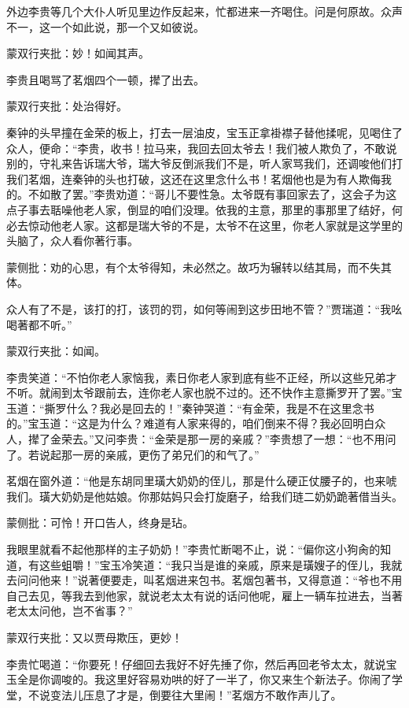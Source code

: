 \begin{parag}


    外边李贵等几个大仆人听见里边作反起来，忙都进来一齐喝住。问是何原故。众声不一，这一个如此说，那一个又如彼说。\begin{note}蒙双行夹批：妙！如闻其声。\end{note}李贵且喝骂了茗烟四个一顿，撵了出去。\begin{note}蒙双行夹批：处治得好。\end{note}秦钟的头早撞在金荣的板上，打去一层油皮，宝玉正拿褂襟子替他揉呢，见喝住了众人，便命：“李贵，收书！拉马来，我回去回太爷去！我们被人欺负了，不敢说别的，守礼来告诉瑞大爷，瑞大爷反倒派我们不是，听人家骂我们，还调唆他们打我们茗烟，连秦钟的头也打破，这还在这里念什么书！茗烟他也是为有人欺侮我的。不如散了罢。”李贵劝道：“哥儿不要性急。太爷既有事回家去了，这会子为这点子事去聒噪他老人家，倒显的咱们没理。依我的主意，那里的事那里了结好，何必去惊动他老人家。这都是瑞大爷的不是，太爷不在这里，你老人家就是这学里的头脑了，众人看你著行事。\begin{note}蒙侧批：劝的心思，有个太爷得知，未必然之。故巧为辗转以结其局，而不失其体。\end{note}众人有了不是，该打的打，该罚的罚，如何等闹到这步田地不管？”贾瑞道：“我吆喝著都不听。”\begin{note}蒙双行夹批：如闻。\end{note}李贵笑道：“不怕你老人家恼我，素日你老人家到底有些不正经，所以这些兄弟才不听。就闹到太爷跟前去，连你老人家也脱不过的。还不快作主意撕罗开了罢。”宝玉道：“撕罗什么？我必是回去的！”秦钟哭道：“有金荣，我是不在这里念书的。”宝玉道：“这是为什么？难道有人家来得的，咱们倒来不得？我必回明白众人，撵了金荣去。”又问李贵：“金荣是那一房的亲戚？”李贵想了一想：“也不用问了。若说起那一房的亲戚，更伤了弟兄们的和气了。”
\end{parag}


\begin{parag}


    茗烟在窗外道：“他是东胡同里璜大奶奶的侄儿，那是什么硬正仗腰子的，也来唬我们。璜大奶奶是他姑娘。你那姑妈只会打旋磨子，给我们琏二奶奶跪著借当头。\begin{note}蒙侧批：可怜！开口告人，终身是玷。\end{note}我眼里就看不起他那样的主子奶奶！”李贵忙断喝不止，说：“偏你这小狗肏的知道，有这些蛆嚼！”宝玉冷笑道：“我只当是谁的亲戚，原来是璜嫂子的侄儿，我就去问问他来！”说著便要走，叫茗烟进来包书。茗烟包著书，又得意道：“爷也不用自己去见，等我去到他家，就说老太太有说的话问他呢，雇上一辆车拉进去，当著老太太问他，岂不省事？”\begin{note}蒙双行夹批：又以贾母欺压，更妙！\end{note}李贵忙喝道：“你要死！仔细回去我好不好先捶了你，然后再回老爷太太，就说宝玉全是你调唆的。我这里好容易劝哄的好了一半了，你又来生个新法子。你闹了学堂，不说变法儿压息了才是，倒要往大里闹！”茗烟方不敢作声儿了。
\end{parag}


